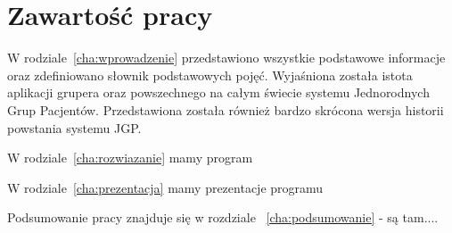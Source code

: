 
\section{Zawartość pracy}
\label{sec:zawartoscPracy}

W rodziale~\ref{cha:wprowadzenie} przedstawiono wszystkie podstawowe informacje oraz zdefiniowano słownik podstawowych pojęć. Wyjaśniona została istota aplikacji grupera oraz powszechnego na całym świecie systemu Jednorodnych Grup Pacjentów. Przedstawiona została również bardzo skrócona wersja historii powstania systemu JGP.

W rodziale~\ref{cha:rozwiazanie} mamy program

W rodziale~\ref{cha:prezentacja} mamy prezentacje programu

Podsumowanie pracy znajduje się w rozdziale ~\ref{cha:podsumowanie} - są tam....

